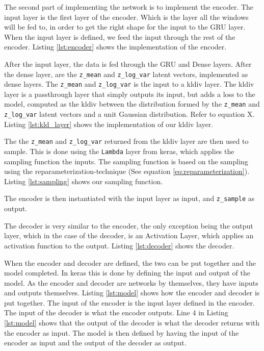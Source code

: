
The second part of implementing the network is to implement the encoder. The input layer is the first layer of the encoder. Which is the layer all the windows will be fed to, in order to get the right shape for the input to the GRU layer. When the input layer is defined, we feed the input through the rest of the encoder. Listing \ref{lst:encoder} shows the implementation of the encoder.


After the input layer, the data is fed through the GRU and Dense layers. After the dense layer, are the \texttt{z\_mean} and \texttt{z\_log\_var} latent vectors, implemented as dense layers. The \texttt{z\_mean} and \texttt{z\_log\_var} is the input to a \gls{kldiv} layer. The \gls{kldiv} layer is a passthrough layer that simply outputs its input, but adds a loss to the model, computed as the \gls{kldiv} between the distribution formed by the \texttt{z\_mean} and \texttt{z\_log\_var} latent vectors and a unit Gaussian distribution. Refer to equation X. Listing \ref{lst:kld_layer} shows the implementation of our \gls{kldiv} layer.


The the \texttt{z\_mean} and \texttt{z\_log\_var} returned from the \gls{kldiv} layer are then used to sample. This is done using the \texttt{Lambda} layer from \gls{keras}, which applies the sampling function the inputs. The sampling function is based on the sampling using the reparameterization-technique (See equation \ref{eq:reparameterization}). Listing \ref{lst:sampling} shows our sampling function.


The encoder is then instantiated with the input layer as input, and \texttt{z\_sample} as output. \newline

\noindent
The decoder is very similar to the encoder, the only exception being the output layer, which in the case of the decoder, is an Activation Layer, which applies an activation function to the output. Listing \ref{lst:decoder} shows the decoder.


\noindent
When the encoder and decoder are defined, the two can be put together and the model completed. In \gls{keras} this is done by defining the input and output of the model. As the encoder and decoder are networks by themselves, they have inputs and outputs themselves. Listing \ref{lst:model} shows how the encoder and decoder is put together. The input of the encoder is the input layer defined in the encoder. The input of the decoder is what the encoder outputs. Line 4 in Listing \ref{lst:model} shows that the output of the decoder is what the decoder returns with the encoder as input. The model is then defined by having the input of the encoder as input and the output of the decoder as output.

